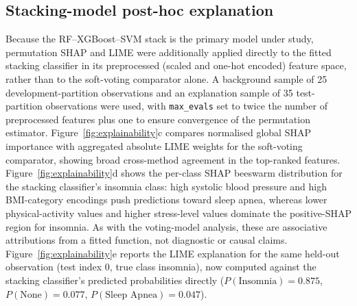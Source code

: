 \documentclass{elektr}
\begin{document}
\subsection{Stacking-model post-hoc explanation}
\label{sec:stackpost}
Because the RF--XGBoost--SVM stack is the primary model under study, permutation SHAP and LIME were additionally applied directly to the fitted stacking classifier in its preprocessed (scaled and one-hot encoded) feature space, rather than to the soft-voting comparator alone. A background sample of 25 development-partition observations and an explanation sample of 35 test-partition observations were used, with \texttt{max\_evals} set to twice the number of preprocessed features plus one to ensure convergence of the permutation estimator.
Figure~\ref{fig:explainability}c compares normalised global SHAP importance with aggregated absolute LIME weights for the soft-voting comparator, showing broad cross-method agreement in the top-ranked features. Figure~\ref{fig:explainability}d shows the per-class SHAP beeswarm distribution for the stacking classifier's insomnia class: high systolic blood pressure and high BMI-category encodings push predictions toward sleep apnea, whereas lower physical-activity values and higher stress-level values dominate the positive-SHAP region for insomnia. As with the voting-model analysis, these are associative attributions from a fitted function, not diagnostic or causal claims. Figure~\ref{fig:explainability}e reports the LIME explanation for the same held-out observation (test index 0, true class insomnia), now computed against the stacking classifier's predicted probabilities directly ($P(\text{Insomnia})=0.875$, $P(\text{None})=0.077$, $P(\text{Sleep Apnea})=0.047$).
\end{document}
